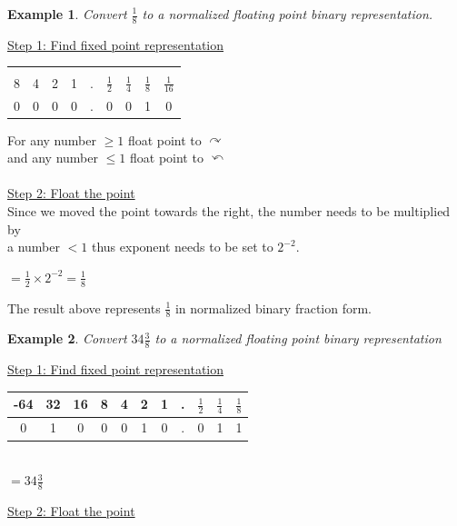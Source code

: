 \documentclass[12pt, a4paper]{report}
\newtheorem{example}{Example}
\begin{document}
	
	\begin{example}
		Convert $\frac{1}{8}$ to a normalized floating  point binary representation.\\
	\end{example}
	\underline{Step 1: Find fixed point representation} 
	\begin{center}
		\begin{tabular}{ccccccccc}
			&   &   &   &   &               &               &               &                \\
			8 & 4 & 2 & 1 & . & $\frac{1}{2}$ & $\frac{1}{4}$ & $\frac{1}{8}$ & $\frac{1}{16}$ \\ \hline
			0 & 0 & 0 & 0 & . & 0             & 0             & 1             & 0              
		\end{tabular}
	\end{center}	
	For any number $\geq 1$ float point to $\curvearrowright$\\
	and any number $\leq 1$ float point to $\curvearrowleft$\\
	\\
	\underline{Step 2: Float the point}\\
	
	
	Since we moved the point towards the right, the number needs to be multiplied by\\ a number $<1$ thus exponent needs to be set to  $2^{-2}$.
	\begin{center}
		
		$=\frac{1}{2} \times 2^{-2} = \frac{1}{8}$
	\end{center}
	The result above represents $\frac{1}{8}$ in  normalized binary fraction form.
	
	\begin{example}
		Convert $34 \frac{3}{8}$ to a normalized floating point binary representation
		
	\end{example}
	\underline{Step 1: Find fixed point representation}	 \\
	\begin{center}
		\begin{tabular}{ccccccc	cccc}
			-64 & 32 & 16 & 8 & 4 & 2 & 1 & . & $\frac{1}{2}$ & $\frac{1}{4}$ & $\frac{1}{8}$ \\ \hline
			0   & 1  & 0  & 0 & 0 & 1 & 0 & . & 0             & 1             & 1             
		\end{tabular}\\
		$=34\frac{3}{8}$
	\end{center}
	\underline{Step 2: Float the point}\\
	
\end{document}
